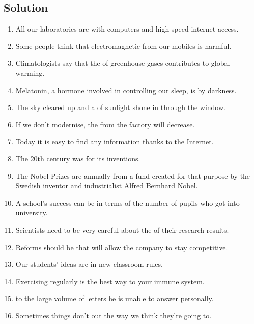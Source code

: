 \subsection*{Solution}
\begin{enumerate}
      \item All our laboratories are  with computers and high-speed
            internet access.
      \item Some people think that electromagnetic  from our
            mobiles is harmful.
      \item Climatologists say that the  of greenhouse gases
            contributes to global warming.
      \item Melatonin, a hormone involved in controlling our sleep, is
             by darkness.
      \item The sky cleared up and a  of sunlight shone in through
            the window.
      \item If we don’t modernise, the  from the factory will
            decrease.
      \item Today it is  easy to find any information thanks
            to the Internet.
      \item The 20th century was  for its inventions.
      \item The Nobel Prizes are  annually from a fund created
            for that purpose by the Swedish inventor and industrialist Alfred Bernhard
            Nobel.
      \item A school’s success can be  in terms of the number
            of pupils who got into university.
      \item Scientists need to be very careful about the  of
            their research results.
      \item Reforms should be  that will allow the company
            to stay competitive.
      \item Our students’ ideas are  in new classroom rules.
      \item Exercising regularly is the best way to  your
            immune system.
      \item {} to the large volume of letters he is unable to answer
            personally.
      \item Sometimes things don't  out the way we think they're
            going to.
\end{enumerate}

